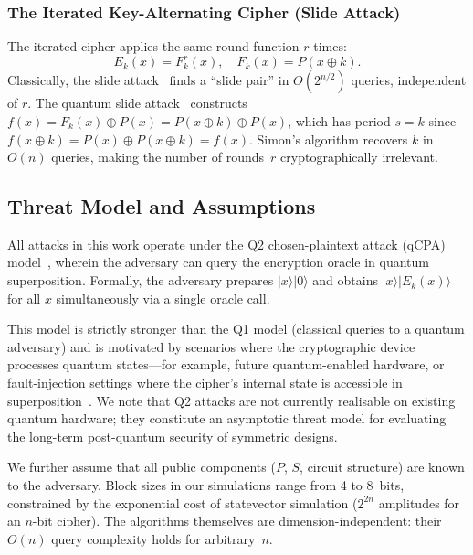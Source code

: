 \documentclass[11pt,a4paper]{article}
\begin{document}
\subsubsection{The Iterated Key-Alternating Cipher (Slide Attack)}

The iterated cipher applies the same round function $r$ times:
\begin{equation}\label{eq:slide}
    E_k(x) = F_k^r(x), \quad F_k(x) = P(x \oplus k).
\end{equation}
Classically, the slide attack~\cite{Biryukov1999, Biryukov2000} finds a
``slide pair'' in $O(2^{n/2})$ queries, independent of $r$.  The quantum
slide attack~\cite{Kaplan2016, Bonnetain2019} constructs
$f(x) = F_k(x) \oplus P(x) = P(x\oplus k) \oplus P(x)$,
which has period $s = k$ since $f(x\oplus k) = P(x) \oplus P(x\oplus k)
= f(x)$.  Simon's algorithm recovers $k$ in $O(n)$ queries, making the
number of rounds~$r$ cryptographically irrelevant.

\subsection{Threat Model and Assumptions}

All attacks in this work operate under the Q2 chosen-plaintext attack
(qCPA) model~\cite{BonehZhandry2013, Gagliardoni2016}, wherein the
adversary can query the encryption oracle in quantum superposition.
Formally, the adversary prepares $|x\rangle|0\rangle$ and obtains
$|x\rangle|E_k(x)\rangle$ for all $x$ simultaneously via a single
oracle call.

This model is strictly stronger than the Q1 model (classical queries to
a quantum adversary) and is motivated by scenarios where the
cryptographic device processes quantum states---for example, future
quantum-enabled hardware, or fault-injection settings where the cipher's
internal state is accessible in
superposition~\cite{Kaplan2016,Bonnetain2020}.  We note that Q2 attacks
are not currently realisable on existing quantum hardware; they
constitute an asymptotic threat model for evaluating the long-term
post-quantum security of symmetric designs.

We further assume that all public components ($P$, $S$, circuit
structure) are known to the adversary.  Block sizes in our simulations
range from 4 to 8~bits, constrained by the exponential cost of
statevector simulation ($2^{2n}$ amplitudes for an $n$-bit cipher).
The algorithms themselves are dimension-independent: their $O(n)$
query complexity holds for arbitrary~$n$.
\end{document}
